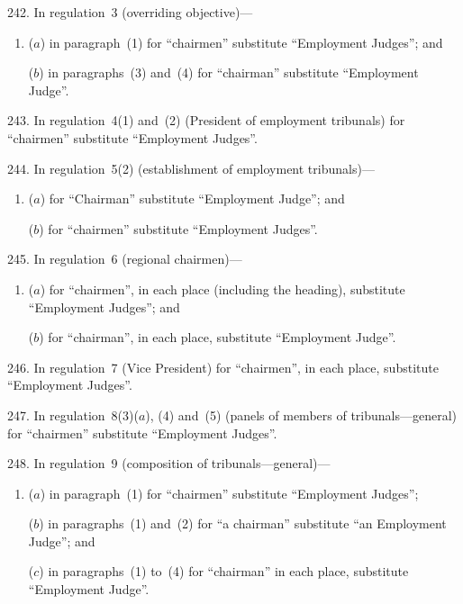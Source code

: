 \documentclass[12pt,a4paper]{article}
\begin{document}
\medskip

242.  In regulation~3 (overriding objective)—
\begin{enumerate}\item[]
($a$) in paragraph~(1) for “chairmen” substitute “Employment Judges”; and

($b$) in paragraphs~(3) and~(4) for “chairman” substitute “Employment Judge”.
\end{enumerate}

\medskip

243.  In regulation~4(1) and~(2) (President of employment tribunals) for “chairmen” substitute “Employment Judges”.

\medskip

244.  In regulation~5(2) (establishment of employment tribunals)—
\begin{enumerate}\item[]
($a$) for “Chairman” substitute “Employment Judge”; and

($b$) for “chairmen” substitute “Employment Judges”.
\end{enumerate}

\medskip

245.  In regulation~6 (regional chairmen)—
\begin{enumerate}\item[]
($a$) for “chairmen”, in each place (including the heading), substitute “Employment Judges”; and

($b$) for “chairman”, in each place, substitute “Employment Judge”.
\end{enumerate}

\medskip

246.  In regulation~7 (Vice President) for “chairmen”, in each place, substitute “Employment Judges”.

\medskip

247.  In regulation~8(3)($a$), (4) and~(5) (panels of members of tribunals---general) for “chairmen” substitute “Employment Judges”.

\medskip

248.  In regulation~9 (composition of tribunals---general)—
\begin{enumerate}\item[]
($a$) in paragraph~(1) for “chairmen” substitute “Employment Judges”;

($b$) in paragraphs~(1) and~(2) for “a chairman” substitute “an Employment Judge”; and

($c$) in paragraphs~(1) to~(4) for “chairman” in each place, substitute “Employment Judge”.
\end{enumerate}
\end{document}
